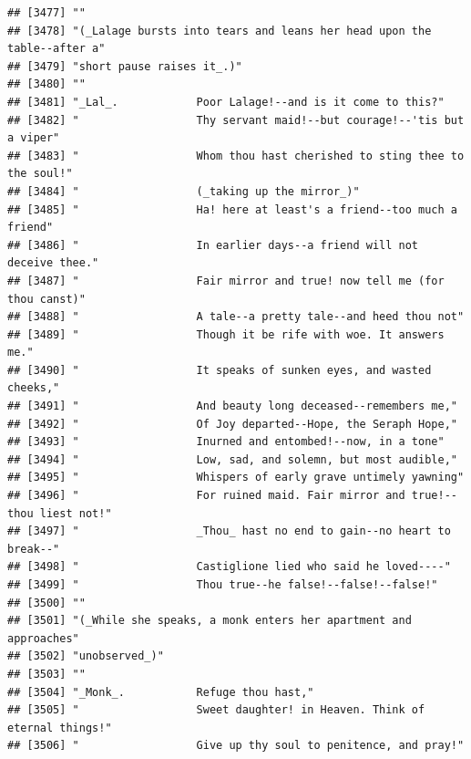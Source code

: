 \documentclass{article}\usepackage[]{graphicx}\usepackage[]{color}
\makeatletter
\newenvironment{kframe}{%
 \def\at@end@of@kframe{}%
 \ifinner\ifhmode%
  \def\at@end@of@kframe{\end{minipage}}%
  \begin{minipage}{\columnwidth}%
 \fi\fi%
 \def\FrameCommand##1{\hskip\@totalleftmargin \hskip-\fboxsep
 \colorbox{shadecolor}{##1}\hskip-\fboxsep
     \hskip-\linewidth \hskip-\@totalleftmargin \hskip\columnwidth}%
 \MakeFramed {\advance\hsize-\width
   \@totalleftmargin\z@ \linewidth\hsize
   \@setminipage}}%
 {\par\unskip\endMakeFramed%
 \at@end@of@kframe}
\newenvironment{knitrout}{}{} %
\makeatother
\begin{document}
\begin{knitrout}
\begin{kframe}
\begin{verbatim}
## [3477] ""                                                                            
## [3478] "(_Lalage bursts into tears and leans her head upon the table--after a"       
## [3479] "short pause raises it_.)"                                                    
## [3480] ""                                                                            
## [3481] "_Lal_.            Poor Lalage!--and is it come to this?"                     
## [3482] "                  Thy servant maid!--but courage!--'tis but a viper"         
## [3483] "                  Whom thou hast cherished to sting thee to the soul!"       
## [3484] "                  (_taking up the mirror_)"                                  
## [3485] "                  Ha! here at least's a friend--too much a friend"           
## [3486] "                  In earlier days--a friend will not deceive thee."          
## [3487] "                  Fair mirror and true! now tell me (for thou canst)"        
## [3488] "                  A tale--a pretty tale--and heed thou not"                  
## [3489] "                  Though it be rife with woe. It answers me."                
## [3490] "                  It speaks of sunken eyes, and wasted cheeks,"              
## [3491] "                  And beauty long deceased--remembers me,"                   
## [3492] "                  Of Joy departed--Hope, the Seraph Hope,"                   
## [3493] "                  Inurned and entombed!--now, in a tone"                     
## [3494] "                  Low, sad, and solemn, but most audible,"                   
## [3495] "                  Whispers of early grave untimely yawning"                  
## [3496] "                  For ruined maid. Fair mirror and true!--thou liest not!"   
## [3497] "                  _Thou_ hast no end to gain--no heart to break--"           
## [3498] "                  Castiglione lied who said he loved----"                    
## [3499] "                  Thou true--he false!--false!--false!"                      
## [3500] ""                                                                            
## [3501] "(_While she speaks, a monk enters her apartment and approaches"              
## [3502] "unobserved_)"                                                                
## [3503] ""                                                                            
## [3504] "_Monk_.           Refuge thou hast,"                                         
## [3505] "                  Sweet daughter! in Heaven. Think of eternal things!"       
## [3506] "                  Give up thy soul to penitence, and pray!"                  

\end{verbatim}
\end{kframe}
\end{knitrout}
\end{document}
